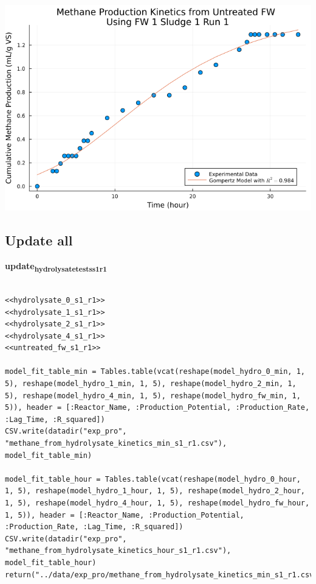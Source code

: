 \documentclass[11pt]{article}
\begin{document}
\begin{center}
\includegraphics[width=.9\linewidth]{../plots/BMPs/Untreated FW/specific_methane_kinetics_untreated_fw_s1_r1_hour.png}
\end{center}

\subsection{Update all}
\label{sec:org466b08b}

\textbf{update\textsubscript{hydrolysate}\textsubscript{tests}\textsubscript{s1}\textsubscript{r1}}
\begin{verbatim}

<<hydrolysate_0_s1_r1>>
<<hydrolysate_1_s1_r1>>
<<hydrolysate_2_s1_r1>>
<<hydrolysate_4_s1_r1>>
<<untreated_fw_s1_r1>>

model_fit_table_min = Tables.table(vcat(reshape(model_hydro_0_min, 1, 5), reshape(model_hydro_1_min, 1, 5), reshape(model_hydro_2_min, 1, 5), reshape(model_hydro_4_min, 1, 5), reshape(model_hydro_fw_min, 1, 5)), header = [:Reactor_Name, :Production_Potential, :Production_Rate, :Lag_Time, :R_squared])
CSV.write(datadir("exp_pro", "methane_from_hydrolysate_kinetics_min_s1_r1.csv"), model_fit_table_min)

model_fit_table_hour = Tables.table(vcat(reshape(model_hydro_0_hour, 1, 5), reshape(model_hydro_1_hour, 1, 5), reshape(model_hydro_2_hour, 1, 5), reshape(model_hydro_4_hour, 1, 5), reshape(model_hydro_fw_hour, 1, 5)), header = [:Reactor_Name, :Production_Potential, :Production_Rate, :Lag_Time, :R_squared])
CSV.write(datadir("exp_pro", "methane_from_hydrolysate_kinetics_hour_s1_r1.csv"), model_fit_table_hour)
return("../data/exp_pro/methane_from_hydrolysate_kinetics_min_s1_r1.csv")
\end{verbatim}
\end{document}
